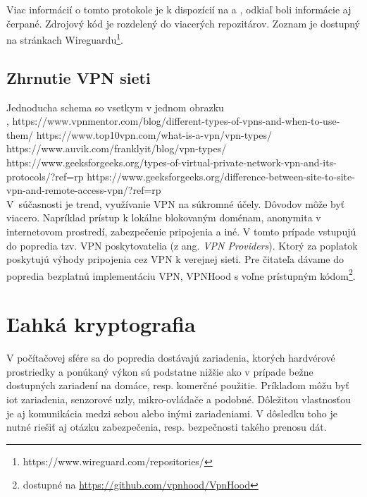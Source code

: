 Viac informácií o tomto protokole je k dispozícií na \cite{wireguard} a \cite{wireguardpdf}, odkiaľ boli informácie aj čerpané. Zdrojový kód je rozdelený do viacerých repozitárov. Zoznam je dostupný na stránkach Wireguardu\footnote{https://www.wireguard.com/repositories/}.
\section{Zhrnutie VPN sieti}
Jednoducha schema so vsetkym v jednom obrazku \\

 
\cite{divvpn}, \cite{ciscovpn}
https://www.vpnmentor.com/blog/different-types-of-vpns-and-when-to-use-them/
https://www.top10vpn.com/what-is-a-vpn/vpn-types/
https://www.auvik.com/franklyit/blog/vpn-types/
https://www.geeksforgeeks.org/types-of-virtual-private-network-vpn-and-its-protocols/?ref=rp
https://www.geeksforgeeks.org/difference-between-site-to-site-vpn-and-remote-access-vpn/?ref=rp
\\
V~súčasnosti je trend, využívanie VPN na súkromné účely. Dôvodov môže byť viacero. Napríklad prístup k lokálne blokovaným doménam, anonymita v internetovom prostredí, zabezpečenie pripojenia a iné. V tomto prípade vstupujú do popredia tzv. VPN poskytovatelia (z ang. \textit{VPN Providers}). Ktorý za poplatok poskytujú výhody pripojenia cez VPN k verejnej sieti. Pre čitateľa dávame do popredia bezplatnú implementáciu VPN, VPNHood s voľne prístupným kódom\footnote{dostupné na \url{https://github.com/vpnhood/VpnHood}}.  

\chapter{Ľahká kryptografia}\label{krypto}
V počítačovej sfére sa do popredia dostávajú zariadenia, ktorých hardvérové prostriedky a ponúkaný výkon sú podstatne nižšie ako v prípade bežne dostupných zariadení na domáce, resp. komerčné použitie. Príkladom môžu byť \acrshort{iot} zariadenia, senzorové uzly, mikro-ovládače a podobné. Dôležitou vlastnosťou je aj komunikácia medzi sebou alebo inými zariadeniami. V dôsledku toho je nutné riešiť aj otázku zabezpečenia, resp. bezpečnosti takého prenosu dát. 

